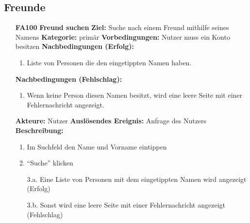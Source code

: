 \documentclass[parskip=full]{scrartcl}
\begin{document}
		\subsection{Freunde} \label{sec:FAFreunde}
		\begin{itemize}[nosep]
			\item[\textbf{FA100}]\textbf{Freund suchen}
			\newline\newline \textbf{Ziel:} Suche nach einem Freund mithilfe seines Namens
			\newline \textbf{Kategorie:} primär
			\newline \textbf{Vorbedingungen:} Nutzer muss ein Konto besitzen
			\newline \textbf{Nachbedingungen (Erfolg):} 
			\begin{enumerate}[nosep]
				\item Liste von Personen die den eingetippten Namen haben.
			\end{enumerate}
			\textbf{Nachbedingungen (Fehlschlag):} 
			\begin{enumerate}[nosep]
				\item Wenn keine Person diesen Namen besitzt, wird eine leere Seite mit einer Fehlernachricht angezeigt.
			\end{enumerate}  
			\textbf{Akteure:} Nutzer
			\newline \textbf{Auslösendes Ereignis:} Anfrage des Nutzers
			\newline \textbf{Beschreibung:}
				\begin{enumerate}[nosep]
					\item Im Suchfeld den Name und Vorname eintippen
					\item “Suche” klicken
					\item[3.a.] Eine Liste von Personen mit dem eingetippten Namen wird angezeigt (Erfolg)
					\item[3.b.] Sonst wird eine leere Seite mit einer Fehlernachricht angezeigt (Fehlschlag) \\
				\end{enumerate}
			

\end{itemize}
\end{document}
